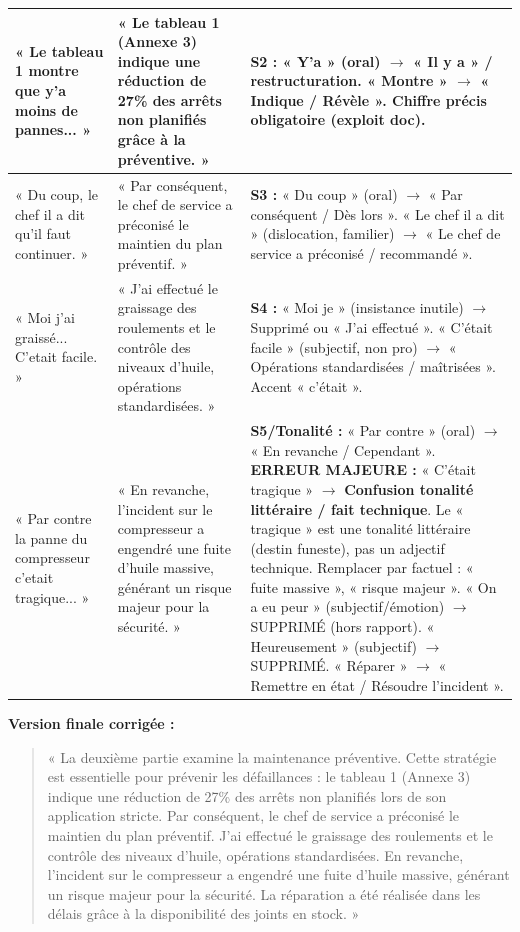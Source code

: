 \documentclass[11pt]{article}
\begin{document}
\begin{exoresolu}
\begin{center}
\begin{tabularx}{\linewidth}{|l|X|X|}
        « Le tableau 1 montre que y'a moins de pannes... » & « Le tableau 1 (Annexe 3) indique une réduction de 27\% des arrêts non planifiés grâce à la préventive. » & \textbf{S2 :} « Y'a » (oral) $\rightarrow$ « Il y a » / restructuration. « Montre » $\rightarrow$ « Indique / Révèle ». Chiffre précis obligatoire (exploit doc). \\\hline
        « Du coup, le chef il a dit qu'il faut continuer. » & « Par conséquent, le chef de service a préconisé le maintien du plan préventif. » & \textbf{S3 :} « Du coup » (oral) $\rightarrow$ « Par conséquent / Dès lors ». « Le chef il a dit » (dislocation, familier) $\rightarrow$ « Le chef de service a préconisé / recommandé ». \\\hline
        « Moi j'ai graissé... C'etait facile. » & « J'ai effectué le graissage des roulements et le contrôle des niveaux d'huile, opérations standardisées. » & \textbf{S4 :} « Moi je » (insistance inutile) $\rightarrow$ Supprimé ou « J'ai effectué ». « C'était facile » (subjectif, non pro) $\rightarrow$ « Opérations standardisées / maîtrisées ». Accent « c'était ». \\\hline
        « Par contre la panne du compresseur c'etait tragique... » & « En revanche, l'incident sur le compresseur a engendré une fuite d'huile massive, générant un risque majeur pour la sécurité. » & \textbf{S5/Tonalité :} « Par contre » (oral) $\rightarrow$ « En revanche / Cependant ». \textbf{ERREUR MAJEURE :} « C'était tragique » $\rightarrow$ \textbf{Confusion tonalité littéraire / fait technique}. Le « tragique » est une tonalité littéraire (destin funeste), pas un adjectif technique. Remplacer par factuel : « fuite massive », « risque majeur ». « On a eu peur » (subjectif/émotion) $\rightarrow$ SUPPRIMÉ (hors rapport). « Heureusement » (subjectif) $\rightarrow$ SUPPRIMÉ. « Réparer » $\rightarrow$ « Remettre en état / Résoudre l'incident ». \\\hline
        \end{tabularx}
    \end{center}
    \textbf{Version finale corrigée :}
    \begin{quote}
        « La deuxième partie examine la maintenance préventive. Cette stratégie est essentielle pour prévenir les défaillances : le tableau 1 (Annexe 3) indique une réduction de 27\% des arrêts non planifiés lors de son application stricte. Par conséquent, le chef de service a préconisé le maintien du plan préventif. J'ai effectué le graissage des roulements et le contrôle des niveaux d'huile, opérations standardisées. En revanche, l'incident sur le compresseur a engendré une fuite d'huile massive, générant un risque majeur pour la sécurité. La réparation a été réalisée dans les délais grâce à la disponibilité des joints en stock. »
    \end{quote}
\end{exoresolu}
\end{document}

